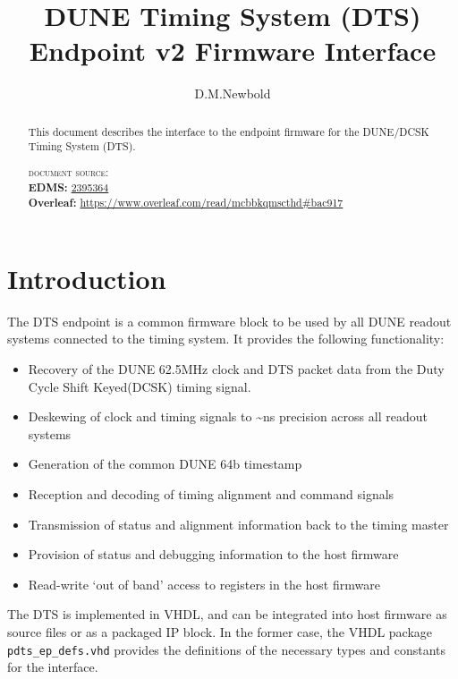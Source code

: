 \documentclass[fleqn,12pt,a4paper]{olplainarticle}
\title{DUNE Timing System (DTS) Endpoint v2 Firmware Interface }
\author[1]{D.M.Newbold}
\affil[1]{H.H. Wills Physics Laboratory, Bristol, UK}
\begin{document}

\begin{abstract}
    This document describes the interface to the endpoint firmware for the DUNE/DCSK Timing System (DTS).

    \textsc{document source:}\\
    {\bf EDMS:} \href{https://edms.cern.ch/document/2395364}{2395364} \\
    {\bf Overleaf:}  \url{https://www.overleaf.com/read/mcbbkqmscthd#bac917}
    
\end{abstract}

\flushbottom

\maketitle

\begin{versionhistory}
\end{versionhistory}

\newpage

\section{Introduction}

The DTS endpoint is a common firmware block to be used by all DUNE readout systems connected to the timing system. It provides the following functionality:
\begin{itemize}
\item Recovery of the DUNE 62.5MHz clock and DTS packet data from the Duty Cycle Shift Keyed(DCSK) timing signal.
\item Deskewing of clock and timing signals to \textasciitilde{}ns precision across all readout systems
\item Generation of the common DUNE 64b timestamp
\item Reception and decoding of timing alignment and command signals
\item Transmission of status and alignment information back to the timing master
\item Provision of status and debugging information to the host firmware
\item Read-write ‘out of band’ access to registers in the host firmware
\end{itemize}
The DTS is implemented in VHDL, and can be integrated into host firmware as source files or as a packaged IP block. In the former case, the VHDL package \texttt{pdts\_ep\_defs.vhd} provides the definitions of the necessary types and constants for the interface.
\end{document}
